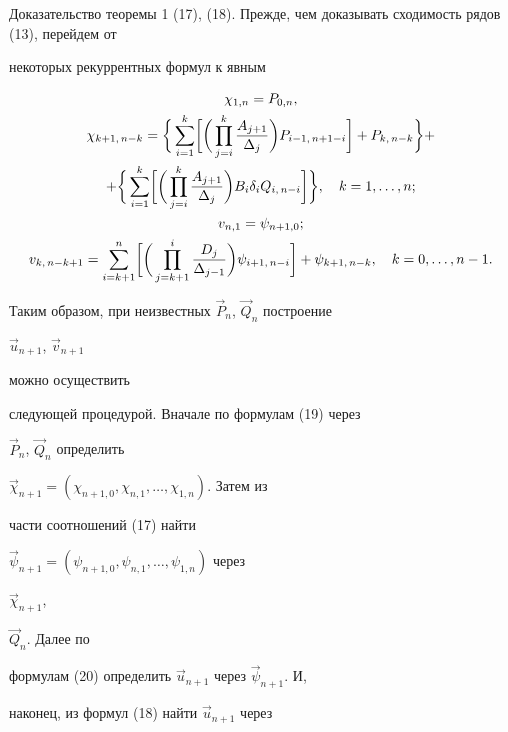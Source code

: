 \begin{pf*}{Доказательство теоремы 1}
(17), (18). Прежде, чем доказывать сходимость рядов (13), перейдем от


некоторых рекуррентных формул к явным


\begin{gather}


\chi_{1,n}=P_{0,n},\notag\\


\chi_{k+1,\,n-k}=\biggl\{\,\sum^k_{i=1}\biggl[\biggl(\,


\prod^k_{j=i}\frac{A_{j+1}}{\Delta_j}\biggr)P_{i-1,\,n+1-i}\biggr]


+P_{k,\,n-k}\biggr\}+\notag\\


+\biggl\{\,\sum^k_{i=1}\biggl[\biggl(\,\prod^k_{j=i}


\frac{A_{j+1}}{\Delta_j}\biggr)B_i\delta_iQ_{i,\,n-i}\biggr]\biggr\},


\quad k=1,\dotsc,n;\\


v_{n,1}=\psi_{n+1,0};\notag\\


v_{k,\,n-k+1}=\sum^n_{i=k+1}\biggl[\biggl(\,


\prod^i_{j=k+1}\frac{D_j}{\Delta_{j-1}}\biggr)


\psi_{i+1,\,n-i}\biggr]+\psi_{k+1,\,n-k},\quad


k=0,\dotsc,n-1.


\end{gather}





Таким образом, при неизвестных $\Vec P_n$, $\Vec Q_n$ построение


$\Vec u_{n+1}$, $\Vec v_{n+1}$


можно осуществить


следующей процедурой. Вначале по формулам (19) через


$\Vec P_n$, $\Vec Q_n$ определить


$\Vec \chi_{n+1}=(\chi_{n+1,0},\chi_{n,1},\dotsc,\chi_{1,n})$. Затем из


части соотношений (17) найти


$\Vec \psi_{n+1}=(\psi_{n+1,0},\psi_{n,1},\dotsc,\psi_{1,n})$ через


$\Vec \chi_{n+1}$,


$\Vec Q_n$. Далее по


формулам (20) определить $\Vec u_{n+1}$ через $\Vec \psi_{n+1}$. И,


наконец, из формул (18) найти $\Vec u_{n+1}$ через



\end{pf*}
